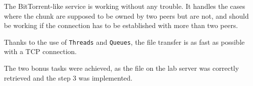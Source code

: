 The BitTorrent-like service is working without any trouble. It handles the cases where the chunk are supposed to be owned by two peers but are not, and should be working if the connection has to be established with more than two peers.

Thanks to the use of \texttt{Threads} and \texttt{Queues}, the file transfer is as fast as possible with a TCP connection. 

The two bonus tasks were achieved, as the file on the lab server was correctly retrieved and the step 3 was implemented.